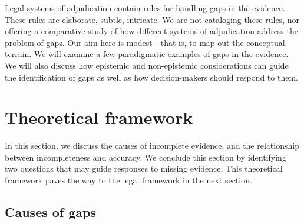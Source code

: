 \documentclass[
  10pt,
  dvipsnames,enabledeprecatedfontcommands]{scrartcl}
\begin{document}
Legal systems of adjudication contain rules for handling gaps in the
evidence. These rules are elaborate, subtle, intricate. We are not
cataloging these rules, nor offering a comparative study of how
different systems of adjudication address the problem of gaps. Our aim
here is modest---that is, to map out the conceptual terrain. We will
examine a few paradigmatic examples of gaps in the evidence. We will
also discuss how epistemic and non-epistemic considerations can guide
the identification of gaps as well as how decision-makers should respond
to them.


\hypertarget{theoretical-framework}{%
\section{Theoretical framework}\label{theoretical-framework}}

In this section, we discuss the causes of incomplete evidence, and the
relationship between incompleteness and accuracy. We conclude this
section by identifying two questions that may guide responses to missing
evidence. This theoretical framework paves the way to the legal
framework in the next section.

\hypertarget{causes-of-gaps}{%
\subsection{Causes of gaps}\label{causes-of-gaps}}
\end{document}
